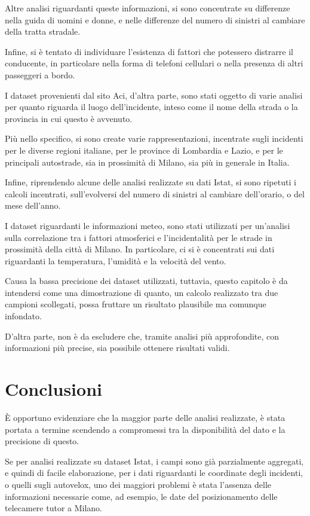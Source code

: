 \documentclass[a4paper]{article}
\newcommand{\skipline}{\vspace{0.2in}}
\begin{document}
Altre analisi riguardanti queste informazioni, si sono concentrate su differenze nella 
guida di uomini e donne, e nelle differenze del numero di sinistri al cambiare della tratta stradale. 

Infine, si è tentato di individuare l'esistenza di fattori che 
potessero distrarre il conducente, in particolare nella forma di telefoni cellulari 
o nella presenza di altri passeggeri a bordo. 

\skipline
I dataset provenienti dal sito Aci, d'altra parte, sono stati oggetto di varie analisi per 
quanto riguarda il luogo dell'incidente, inteso come il nome della strada o la provincia 
in cui questo è avvenuto. 

Più nello specifico, si sono create varie rappresentazioni, incentrate sugli incidenti 
per le diverse regioni italiane, per le province di Lombardia e Lazio, e per le 
principali autostrade, sia in prossimità di Milano, sia più in generale in Italia. 

Infine, riprendendo alcune delle analisi realizzate su dati Istat, si sono ripetuti i 
calcoli incentrati, sull'evolversi del numero di sinistri al 
cambiare dell'orario, o del mese dell'anno.

\skipline
I dataset riguardanti le informazioni meteo, sono stati utilizzati per un'analisi sulla 
correlazione tra i fattori atmosferici e l'incidentalità per le strade in 
prossimità della città di Milano. 
In particolare, ci si è concentrati sui dati riguardanti la temperatura, 
l'umidità e la velocità del vento. 

Causa la bassa precisione dei dataset utilizzati, tuttavia, questo capitolo è 
da intendersi come una dimostrazione di quanto, un calcolo realizzato tra due campioni 
scollegati, possa fruttare un risultato plausibile ma comunque infondato. 

D'altra parte, non è da escludere che, tramite analisi più approfondite, 
con informazioni più precise, sia possibile ottenere risultati validi.

\section{Conclusioni}

\`E opportuno evidenziare che la maggior parte delle analisi realizzate, 
è stata portata a termine scendendo a compromessi tra la disponibilità del dato e la 
precisione di questo. 

Se per analisi realizzate su dataset Istat, i campi sono già 
parzialmente aggregati, e quindi di facile elaborazione, 
per i dati riguardanti le coordinate degli incidenti, 
o quelli sugli autovelox, uno dei maggiori problemi è stata l'assenza delle 
informazioni necessarie come, ad esempio, le date del 
posizionamento delle telecamere tutor a Milano. 
\end{document}
